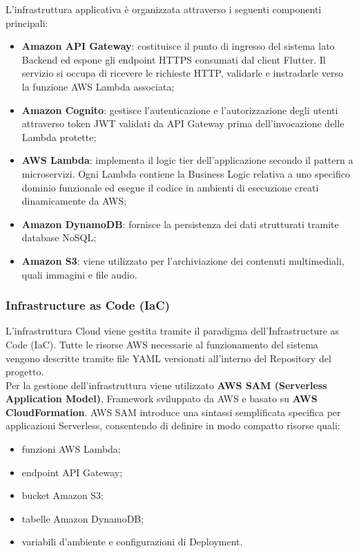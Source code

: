 \documentclass[a4paper,12pt]{article}
\newcommand{\ignoreglossary}{}
\begin{document}
L'infrastruttura applicativa è organizzata attraverso i seguenti componenti principali:
\begin{itemize}
    \item \textbf{Amazon API Gateway}: costituisce il punto di ingresso del sistema lato Backend ed espone gli endpoint HTTPS consumati dal client Flutter. 
    Il servizio si occupa di ricevere le richieste HTTP, validarle e instradarle verso la funzione AWS Lambda associata;
    \item \textbf{Amazon Cognito}: gestisce l'autenticazione e l'autorizzazione degli utenti attraverso token JWT validati da API Gateway prima dell'invocazione delle Lambda protette;
    \item \textbf{AWS Lambda}: implementa il logic tier dell'applicazione secondo il pattern a microservizi. 
    Ogni Lambda contiene la Business Logic relativa a uno specifico dominio funzionale ed esegue il codice in ambienti di esecuzione creati dinamicamente da AWS;
    \item \textbf{Amazon DynamoDB}: fornisce la persistenza dei dati strutturati tramite database NoSQL;
    \item \textbf{Amazon S3}: viene utilizzato per l'archiviazione dei contenuti multimediali, quali immagini e file audio.
\end{itemize}

\subsubsection{\ignoreglossary{Infrastructure as Code} (IaC)}
L'infrastruttura Cloud viene gestita tramite il paradigma dell'Infrastructure as Code (IaC). 
Tutte le risorse AWS necessarie al funzionamento del sistema vengono descritte tramite file YAML versionati all'interno del Repository del progetto.\\

Per la gestione dell'infrastruttura viene utilizzato \textbf{AWS SAM (Serverless Application Model)}, Framework sviluppato da AWS e basato su \textbf{AWS CloudFormation}. 
AWS SAM introduce una sintassi semplificata specifica per applicazioni Serverless, consentendo di definire in modo compatto risorse quali:
\begin{itemize}
    \item funzioni AWS Lambda;
    \item endpoint API Gateway;
    \item bucket Amazon S3;
    \item tabelle Amazon DynamoDB;
    \item variabili d'ambiente e configurazioni di Deployment.
\end{itemize}
\end{document}
